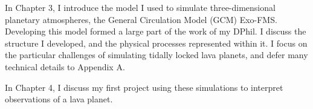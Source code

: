 In Chapter 3, I introduce the model I used to simulate three-dimensional planetary atmospheres, the General Circulation Model (GCM) Exo-FMS. Developing this model formed a large part of the work of my DPhil. I discuss the structure I developed, and the physical processes represented within it. I focus on the particular challenges of simulating tidally locked lava planets, and defer many technical details to Appendix A.

In Chapter 4, I discuss my first project using these simulations to interpret observations of a lava planet.

% 
% 
